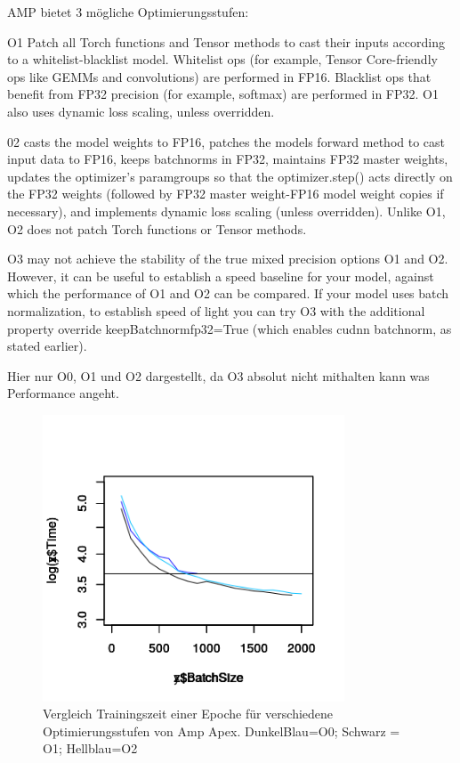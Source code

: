 AMP bietet 3 mögliche Optimierungsstufen:

O1
Patch all Torch functions and Tensor methods to cast their inputs according to a whitelist-blacklist model. Whitelist ops (for example, Tensor Core-friendly ops like GEMMs and convolutions) are performed in FP16. Blacklist ops that benefit from FP32 precision (for example, softmax) are performed in FP32. O1 also uses dynamic loss scaling, unless overridden.

02
casts the model weights to FP16, patches the models forward method to cast input data to FP16, keeps batchnorms in FP32, maintains FP32 master weights, updates the optimizer’s paramgroups so that the optimizer.step() acts directly on the FP32 weights (followed by FP32 master weight-FP16 model weight copies if necessary), and implements dynamic loss scaling (unless overridden). Unlike O1, O2 does not patch Torch functions or Tensor methods.


O3
may not achieve the stability of the true mixed precision options O1 and O2. However, it can be useful to establish a speed baseline for your model, against which the performance of O1 and O2 can be compared. If your model uses batch normalization, to establish speed of light you can try O3 with the additional property override keepBatchnormfp32=True (which enables cudnn batchnorm, as stated earlier).

Hier nur O0, O1 und O2 dargestellt, da O3 absolut nicht mithalten kann was Performance angeht.

\begin{figure}[h]
 \centering
 \includegraphics[width=0.8\textwidth]{KapitelPartB/Images/timeVsBatchSize_Amp.png}
 \caption{Vergleich Trainingszeit einer Epoche für verschiedene Optimierungsstufen von Amp Apex. DunkelBlau=O0; Schwarz = O1; Hellblau=O2}
 \label{fig:amp}
\end{figure}

